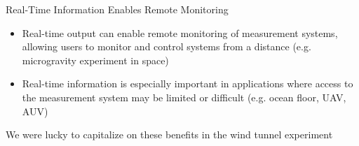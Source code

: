 \begin{frame}[label=why-10]{Real-Time Information Enables Remote Monitoring}

\begin{itemize}
\item Real-time output can enable remote monitoring of measurement systems, allowing users to monitor and control systems from a distance (e.g. microgravity experiment in space)
\item Real-time information is especially important in applications where access to the measurement system may be limited or difficult (e.g. ocean floor, UAV, AUV)
\end{itemize}

\end{frame}




\begin{frame}[label=why-12]{We were lucky to capitalize on these benefits in the wind tunnel experiment}
\begin{center}
\begin{columns}
\hfill
{}
\end{columns}
\end{center}
\end{frame}


